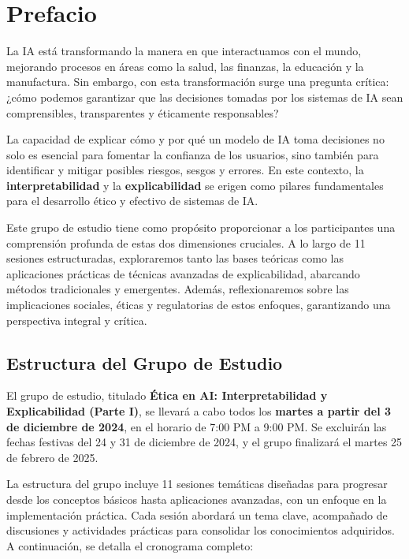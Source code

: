 \chapter*{Prefacio}

La IA está transformando la manera en que interactuamos con el mundo, mejorando procesos en áreas como la salud, las finanzas, la educación y la manufactura. Sin embargo, con esta transformación surge una pregunta crítica: ¿cómo podemos garantizar que las decisiones tomadas por los sistemas de IA sean comprensibles, transparentes y éticamente responsables?

La capacidad de explicar cómo y por qué un modelo de IA toma decisiones no solo es esencial para fomentar la confianza de los usuarios, sino también para identificar y mitigar posibles riesgos, sesgos y errores. En este contexto, la \textbf{interpretabilidad} y la \textbf{explicabilidad} se erigen como pilares fundamentales para el desarrollo ético y efectivo de sistemas de IA.

Este grupo de estudio tiene como propósito proporcionar a los participantes una comprensión profunda de estas dos dimensiones cruciales. A lo largo de 11 sesiones estructuradas, exploraremos tanto las bases teóricas como las aplicaciones prácticas de técnicas avanzadas de explicabilidad, abarcando métodos tradicionales y emergentes. Además, reflexionaremos sobre las implicaciones sociales, éticas y regulatorias de estos enfoques, garantizando una perspectiva integral y crítica.

\section*{Estructura del Grupo de Estudio}
El grupo de estudio, titulado \textbf{Ética en AI: Interpretabilidad y Explicabilidad (Parte I)}, se llevará a cabo todos los \textbf{martes a partir del 3 de diciembre de 2024}, en el horario de 7:00 PM a 9:00 PM. Se excluirán las fechas festivas del 24 y 31 de diciembre de 2024, y el grupo finalizará el martes 25 de febrero de 2025.

La estructura del grupo incluye 11 sesiones temáticas diseñadas para progresar desde los conceptos básicos hasta aplicaciones avanzadas, con un enfoque en la implementación práctica. Cada sesión abordará un tema clave, acompañado de discusiones y actividades prácticas para consolidar los conocimientos adquiridos. A continuación, se detalla el cronograma completo:

